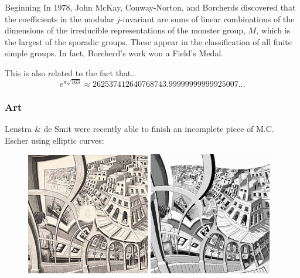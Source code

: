 \begin{frame}[plain]
Beginning In 1978, John McKay, Conway-Norton, and Borcherds discovered that the coefficients in the modular $j$-invariant are sums of linear combinations of the dimensions of the irreducible representations of the monster group, $M$, which is the largest of the sporadic groups. These appear in the classification of all finite simple groups. In fact, Borcherd's work won a Field's Medal. \pspace

This is also related to the fact that\dots
	\[
	e^{\pi \sqrt{163}} \approx 262537412640768743.99999999999925007\dots
	\]
\end{frame}



\begin{frame}[plain] \frametitle{Art} \footnotesize
Lenstra \& de Smit were recently able to finish an incomplete piece of M.C. Escher using elliptic curves:
	\begin{figure}[ht]
	\centering
	\includegraphics[width=0.482\textwidth]{images/escher2.jpg}
	\includegraphics[width=0.478\textwidth]{images/escher_lenstra.jpeg}
	\end{figure}
\end{frame}



